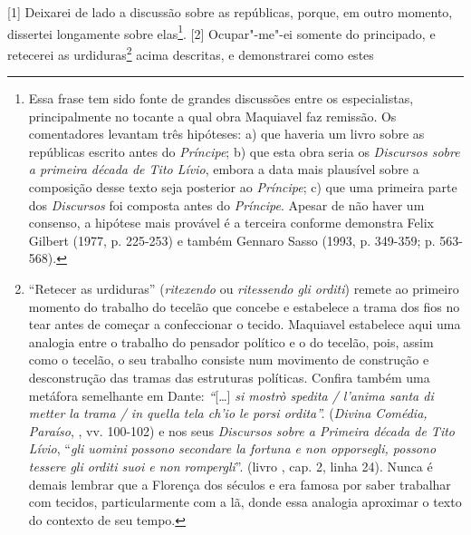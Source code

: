
{[}1{]} Deixarei de lado a discussão sobre as repúblicas, porque, em
outro momento, dissertei longamente sobre elas\footnote{Essa frase tem
  sido fonte de grandes discussões entre os especialistas,
  principalmente no tocante a qual obra Maquiavel faz remissão. Os
  comentadores levantam três hipóteses: a) que haveria um livro sobre as
  repúblicas escrito antes do \emph{Príncipe}; b) que esta obra seria os
  \emph{Discursos sobre a primeira década de Tito Lívio}, embora a data
  mais plausível sobre a composição desse texto seja posterior ao
  \emph{Príncipe}; c) que uma primeira parte dos \emph{Discursos} foi
  composta antes do \emph{Príncipe}. Apesar de não haver um consenso, a
  hipótese mais provável é a terceira conforme demonstra Felix Gilbert
  (1977, p. 225-253) e também Gennaro Sasso (1993, p. 349-359; p.
  563-568).}. {[}2{]} Ocupar"-me"-ei somente do principado, e retecerei as
urdiduras\footnote{``Retecer as urdiduras'' (\emph{ritexendo} ou
  \emph{ritessendo gli orditi}) remete ao primeiro momento do trabalho
  do tecelão que concebe e estabelece a trama dos fios no tear antes de
  começar a confeccionar o tecido. Maquiavel estabelece aqui uma
  analogia entre o trabalho do pensador político e o do tecelão, pois,
  assim como o tecelão, o seu trabalho consiste num movimento de
  construção e desconstrução das tramas das estruturas políticas.
  Confira também uma metáfora semelhante em Dante: \emph{``}{[}\ldots{}{]}
  \emph{si mostrò spedita / l'anima santa di metter la trama / in quella
  tela ch'io le porsi ordita''.} (\emph{Divina Comédia, Paraíso}, ,
  vv. 100-102) e nos seus \emph{Discursos sobre a Primeira década de
  Tito Lívio}, ``\emph{gli uomini possono secondare la fortuna e non
  opporsegli, possono tessere gli orditi suoi e non rompergli}''. (livro
  , cap. 2, linha 24). Nunca é demais lembrar que a Florença dos
  séculos  e  era famosa por saber trabalhar com tecidos,
  particularmente com a lã, donde essa analogia aproximar o texto do
  contexto de seu tempo.} acima descritas, e demonstrarei como estes
